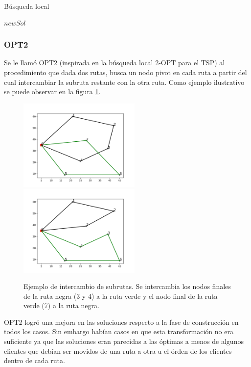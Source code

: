 \documentclass{article}
\begin{document}
  \begin{algorithm}
    \caption{Búsqueda local}
    \label{localsearch}
    \begin{algorithmic}
        \State \Return $newSol$
      \EndFunction
    \end{algorithmic}
  \end{algorithm}

  \subsubsection*{OPT2}

  Se le llamó OPT2 (inspirada en la búsqueda local 2-OPT para el TSP) al procedimiento que dada dos rutas, busca un nodo pivot en cada ruta a partir del cual intercambiar la subruta restante con la otra ruta. Como ejemplo ilustrativo se puede observar en la figura \ref{opt2example}.
  
  \begin{figure}
    \centering
    \includegraphics[width=6cm]{resources/opt2/before.png}
    \includegraphics[width=6cm]{resources/opt2/after.png}
    \caption{Ejemplo de intercambio de subrutas. Se intercambia los nodos finales de la ruta negra (3 y 4) a la ruta verde y el nodo final de la ruta verde (7) a la ruta negra.}
    \label{opt2example}
  \end{figure}

  OPT2 logró una mejora en las soluciones respecto a la fase de construcción en todos los casos. Sin embargo habían casos en que esta transformación no era suficiente ya que las soluciones eran parecidas a las óptimas a menos de algunos clientes que debían ser movidos de una ruta a otra u el órden de los clientes dentro de cada ruta.
\end{document}
